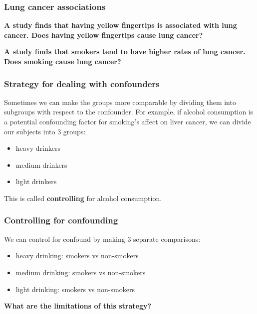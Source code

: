 \documentclass[a4paper]{article}\usepackage[]{graphicx}\usepackage[]{xcolor}
\begin{document}
\subsubsection{Lung cancer associations}
\begin{greenbox}
	\textbf{A study finds that having yellow fingertips is associated with lung cancer. Does having yellow fingertips cause lung cancer?}
\end{greenbox}
\begin{greenbox}
	\textbf{A study finds that smokers tend to have higher rates of lung cancer. Does smoking cause lung cancer?}
\end{greenbox}
\subsubsection{Strategy for dealing with confounders}
Sometimes we can make the groups more comparable by dividing them into subgroups with respect to the confounder.
For example, if alcohol consumption is a potential confounding factor for smoking's affect on liver cancer, we can divide our subjects into 3 groups:
\begin{itemize}
	\item heavy drinkers
	\item medium drinkers
	\item light drinkers
\end{itemize}
This is called \textbf{controlling} for alcohol consumption.
\subsubsection{Controlling for confounding}
We can control for confound by making 3 separate comparisons:
\begin{itemize}
	\item heavy drinking: smokers vs non-smokers
	\item medium drinking: smokers vs non-smokers
	\item light drinking: smokers vs non-smokers
\end{itemize}
\begin{greenbox}
	\textbf{What are the limitations of this strategy?}
\end{greenbox}
\end{document}
